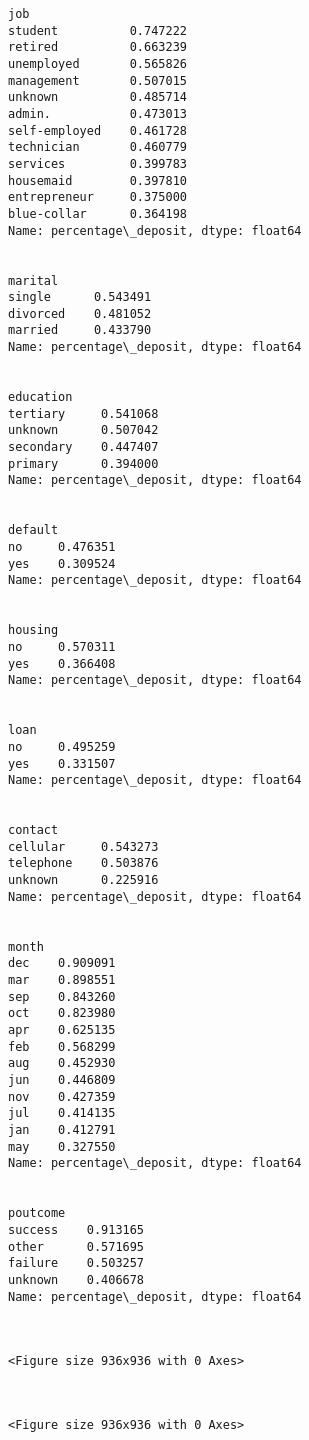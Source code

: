\documentclass[11pt]{article}
\begin{document}
    \begin{Verbatim}[commandchars=\\\{\}]
job
student          0.747222
retired          0.663239
unemployed       0.565826
management       0.507015
unknown          0.485714
admin.           0.473013
self-employed    0.461728
technician       0.460779
services         0.399783
housemaid        0.397810
entrepreneur     0.375000
blue-collar      0.364198
Name: percentage\_deposit, dtype: float64


marital
single      0.543491
divorced    0.481052
married     0.433790
Name: percentage\_deposit, dtype: float64


education
tertiary     0.541068
unknown      0.507042
secondary    0.447407
primary      0.394000
Name: percentage\_deposit, dtype: float64


default
no     0.476351
yes    0.309524
Name: percentage\_deposit, dtype: float64


housing
no     0.570311
yes    0.366408
Name: percentage\_deposit, dtype: float64


loan
no     0.495259
yes    0.331507
Name: percentage\_deposit, dtype: float64


contact
cellular     0.543273
telephone    0.503876
unknown      0.225916
Name: percentage\_deposit, dtype: float64


month
dec    0.909091
mar    0.898551
sep    0.843260
oct    0.823980
apr    0.625135
feb    0.568299
aug    0.452930
jun    0.446809
nov    0.427359
jul    0.414135
jan    0.412791
may    0.327550
Name: percentage\_deposit, dtype: float64


poutcome
success    0.913165
other      0.571695
failure    0.503257
unknown    0.406678
Name: percentage\_deposit, dtype: float64



    \end{Verbatim}

    
    \begin{verbatim}
<Figure size 936x936 with 0 Axes>
    \end{verbatim}

    
    \begin{center}
    \end{center}
    { \hspace*{\fill} \\}
    
    
    \begin{verbatim}
<Figure size 936x936 with 0 Axes>
    \end{verbatim}
\end{document}
